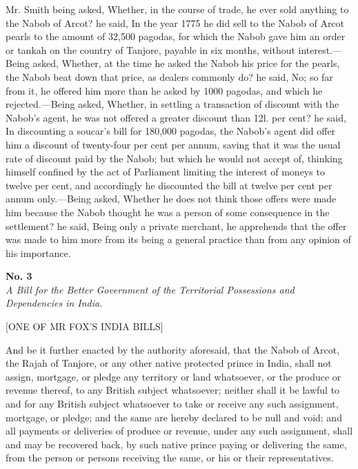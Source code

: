 Mr. Smith being asked, Whether, in the course of trade, he ever sold anything to the Nabob of Arcot? he said, In the year 1775 he did sell to the Nabob of Arcot pearls to the amount of 32,500 pagodas, for which the Nabob gave him an order or tankah on the country of Tanjore, payable in six months, without interest.—Being asked, Whether, at the time he asked the Nabob his price for the pearls, the Nabob beat down that price, as dealers commonly do? he said, No; so far from it, he offered him more than he asked by 1000 pagodas, and which he rejected.—Being asked, Whether, in settling a transaction of discount with the Nabob's agent, he was not offered a greater discount than 12l. per cent? he said, In discounting a soucar's bill for 180,000 pagodas, the Nabob's agent did offer him a discount of twenty-four per cent per annum, saving that it was the usual rate of discount paid by the Nabob; but which he would not accept of, thinking himself confined by the act of Parliament limiting the interest of moneys to twelve per cent, and accordingly he discounted the bill at twelve per cent per annum only.—Being asked, Whether he does not think those offers were made him because the Nabob thought he was a person of some consequence in the settlement? he said, Being only a private merchant, he apprehends that the offer was made to him more from its being a general practice than from any opinion of his importance.

\PRLsep
\begin{center}
  \textbf{\large No. 3}
  \\ \textit{A Bill for the Better Government of the Territorial Possessions and Dependencies in India.}
  \par 
\end{center}
\centerline{[ONE OF MR FOX'S INDIA BILLS]}
\vspace{0.3cm}





And be it further enacted by the authority aforesaid, that the Nabob of Arcot, the Rajah of Tanjore, or any other native protected prince in India, shall not assign, mortgage, or pledge any territory or land whatsoever, or the produce or revenue thereof, to any British subject whatsoever; neither shall it be lawful to and for any British subject whatsoever to take or receive any such assignment, mortgage, or pledge; and the same are hereby declared to be null and void; and all payments or deliveries of produce or revenue, under any such assignment, shall and may be recovered back, by such native prince paying or delivering the same, from the person or persons receiving the same, or his or their representatives.

